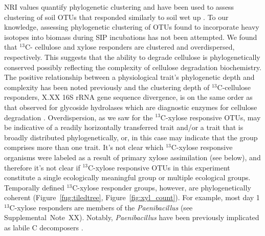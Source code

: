 NRI values quantify phylogenetic clustering \citep{Webb2000} and have 
been used to assess clustering of soil OTUs that responded similarly to soil
wet up \citep{Evans2014a,Placella2012}. To our knowledge, assessing
phylogenetic clustering of OTUs found to incorporate heavy isotopes into
biomass during SIP incubations has not been attempted. We found that $^{13}$C-
cellulose and xylose responders are clustered and overdispersed, respectively.
This suggests that the ability to degrade cellulose is phylogenetically
conserved possibly reflecting the complexity of cellulose degradation
biochemistry. The positive relationship between a physiological trait's
phylogenetic depth and complexity has been noted previously
\citep{Martiny2013a} and the clustering depth of $^{13}$C-cellulose responders,
X.XX 16S rRNA gene sequence divergence, is on the same order as that observed
for glycoside hydrolases which are diagnostic enzymes for cellulose degradation
\citep{Berlemont2013}. Overdispersion, as we saw for the $^{13}$C-xylose
responsive OTUs, may be indicative of a readily horizontally transferred trait
and/or a trait that is broadly distributed phylogenetically, or, in this case
may indicate that the group comprises more than one trait. It's not clear
which $^{13}$C-xylose responsive organisms were labeled as a result of primary
xylose assimilation (see below), and therefore it's not clear if
$^{13}$C-xylose responsive OTUs in this experiment constitute a single
ecologically meaningful group or multiple ecological groups. Temporally defined
$^{13}$C-xylose responder groups, however, are phylogenetically coherent
(Figure~\ref{fug:tiledtree}, Figure~\ref{fig:xyl_count}). For example, most day
1 $^{13}$C-xylose responders are members of the \textit{Paenibacillus} (see
Supplemental~Note~XX). Notably, \textit{Paenibacillus} have been previously
implicated as labile C decomposers \citep{Verastegui_2014}.

